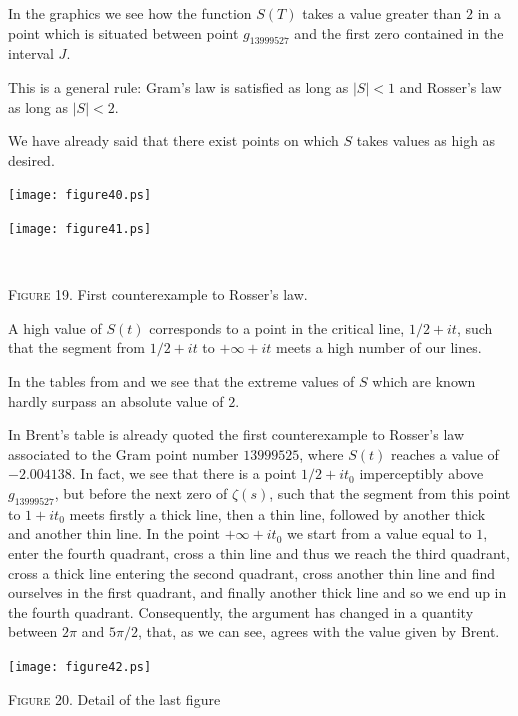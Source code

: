 \documentclass[a4paper]{amsart}
\numberwithin{equation}{section}
\begin{document}
\begin{large}
In the graphics we see how the function $S(T)$ takes a value greater than $2$
in a point which is situated between point $g_{13999527}$ and the first zero
contained in the interval $J$.

This is a general rule: Gram's law is satisfied as long as $\vert S\vert<1$ and
Rosser's law as long as $\vert S\vert <2$.

We have already said that there exist points on which $S$ takes values as high
as desired.


\vfil\eject

\end{large}

\begin{minipage}{330pt} 
\begin{minipage}{154.5pt}
\texttt{[image: figure40.ps]}
\end{minipage}
\hfil
\begin{minipage}{154.5pt}
\texttt{[image: figure41.ps]}
\end{minipage}
\centerline{\ }
\centerline{ {\scshape Figure} 19. First counterexample to Rosser's law.}
\end{minipage}


\begin{large}
\vfil\eject

A high value of $S(t)$ corresponds to a point in the critical
line, $1/2 + it$, such that the segment from $1/2 + it$ to
$+\infty + it$ meets a high number of our lines.

In the tables from \cite{B} and \cite{BLRW} we see that the extreme values of $S$ which are
known hardly surpass an absolute value of $2$.


In Brent's table is already quoted the first counterexample to
Rosser's law associated to the Gram point number $13999525$, where
$S(t)$ reaches a value of $-2.004138$. In fact, we see that there
is a point $1/2 + it_0$ imperceptibly above $g_{13999527}$, but before
the next zero of $\zeta(s)$, such that the segment from this point
to $1 + it_0$ meets firstly a thick line, then a thin line,
followed by another thick and another thin line. In the point
$+\infty + it_0$ we start from a value equal to $1$, enter the
fourth quadrant, cross a thin line and thus we reach the third
quadrant, cross a thick line entering the second quadrant, cross
another thin line and find ourselves in the first quadrant,  and
finally another thick line and so we end up in the fourth
quadrant. Consequently, the argument has changed in a quantity
between $2\pi$ and $5\pi/2$, that, as we can see, agrees with the
value given by Brent.



\vfil
\end{large}
\begin{minipage}{321pt}
\bigskip
\texttt{[image: figure42.ps]}
\vfil
\centerline{{\scshape Figure} 20. Detail of the last figure}
\end{minipage}
\goodbreak
\end{document}
